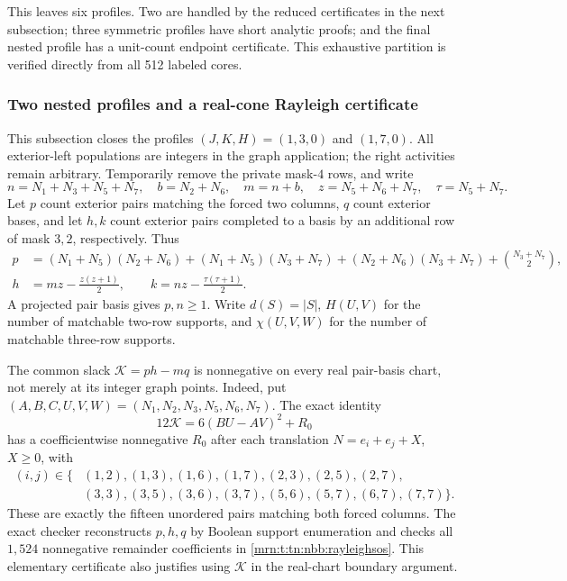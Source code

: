 \documentclass[11pt,a4paper]{article}
\theoremstyle{remark}\newtheorem{remark}[theorem]{Remark}
\begin{document}
This leaves six profiles. Two are handled by the reduced certificates
in the next subsection; three symmetric profiles have short analytic
proofs; and the final nested profile has a unit-count endpoint certificate.
This exhaustive partition is verified directly from all 512 labeled cores.

\subsubsection{Two nested profiles and a real-cone Rayleigh certificate}
\label{mrn:t:tn:nbb:nested}
This subsection closes the profiles $(J,K,H)=(1,3,0)$ and $(1,7,0)$.
All exterior-left populations are integers in the graph application; the
right activities remain arbitrary. Temporarily remove the private mask-$4$
rows, and write
\[
 n=N_1+N_3+N_5+N_7,\quad b=N_2+N_6,\quad m=n+b,
 \quad z=N_5+N_6+N_7,\quad \tau=N_5+N_7.
\]
Let $p$ count exterior pairs matching the forced two columns, $q$ count
exterior bases, and let $h,k$ count exterior pairs completed to a basis by
an additional row of mask $3,2$, respectively. Thus
\begin{align*}
 p&=(N_1+N_5)(N_2+N_6)+(N_1+N_5)(N_3+N_7)
       +(N_2+N_6)(N_3+N_7)+\binom{N_3+N_7}{2},\\
 h&=mz-\frac{z(z+1)}2,\qquad
 k=nz-\frac{\tau(\tau+1)}2.
\end{align*}
A projected pair basis gives $p,n\ge1$. Write $d(S)=|S|$,
$H(U,V)$ for the number of matchable two-row supports, and
$\chi(U,V,W)$ for the number of matchable three-row supports.

The common slack $\mathcal K=ph-mq$ is nonnegative on every real
pair-basis chart, not merely at its integer graph points. Indeed, put
$(A,B,C,U,V,W)=(N_1,N_2,N_3,N_5,N_6,N_7)$. The exact identity
\begin{equation}\label{mrn:t:tn:nbb:rayleighsos}
 12\mathcal K=6(BU-AV)^2+R_0
\end{equation}
has a coefficientwise nonnegative $R_0$ after each translation
$N=e_i+e_j+X$, $X\ge0$, with
\begin{align*}
 (i,j)\in\{&(1,2),(1,3),(1,6),(1,7),(2,3),(2,5),(2,7),\\
             &(3,3),(3,5),(3,6),(3,7),(5,6),(5,7),(6,7),(7,7)\}.
\end{align*}
These are exactly the fifteen unordered pairs matching both forced columns.
The exact checker reconstructs $p,h,q$ by Boolean support enumeration and
checks all $1{,}524$ nonnegative remainder coefficients in
\eqref{mrn:t:tn:nbb:rayleighsos}. This elementary certificate also justifies using
$\mathcal K$ in the real-chart boundary argument.
\end{document}
